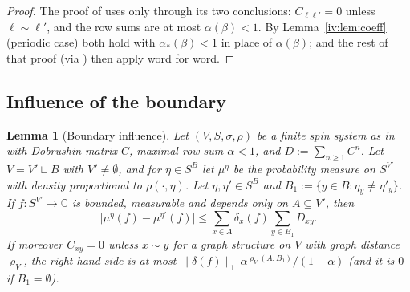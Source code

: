 \documentclass[11pt,a4paper]{article}
\newtheorem{lemma}[theorem]{Lemma}
\theoremstyle{definition}
\theoremstyle{remark}
\newcommand{\C}{\mathbb{C}}
\newcommand{\norm}[1]{\lVert #1\rVert}
\newcommand{\Flab}[2]{\cite[#1 \texttt{#2}]{F}}
\newcommand{\aS}{\alpha_*}
\begin{document}
\begin{proof}
The proof of \Flab{Theorem}{thm:strong} uses \Flab{Lemma}{lem:dobrushinbound} only through its two conclusions: $C_{\ell\ell'}=0$
unless $\ell\sim\ell'$, and the row sums are at most $\alpha(\beta)<1$. By Lemma~\ref{iv:lem:coeff} (periodic case) both hold
with $\aS(\beta)<1$ in place of $\alpha(\beta)$; \Flab{Theorem}{thm:dobrushin} and the rest of that proof (via
\Flab{Corollary}{cor:gapfromcorr}) then apply word for word.
\end{proof}

\subsection{Influence of the boundary}

\begin{lemma}[Boundary influence]\label{iv:lem:boundary}
Let $(V,S,\sigma,\rho)$ be a finite spin system as in \Flab{Definition}{def:spin} with Dobrushin matrix $C$, maximal row sum
$\alpha<1$, and $D:=\sum_{n\ge1}C^n$. Let $V=V'\sqcup B$ with $V'\neq\emptyset$, and for $\eta\in S^B$ let $\mu^\eta$ be the
probability measure on $S^{V'}$ with density proportional to $\rho(\cdot,\eta)$. Let $\eta,\eta'\in S^B$ and
$B_1:=\{y\in B:\eta_y\neq\eta'_y\}$. If $f:S^{V'}\to\C$ is bounded, measurable and depends only on $A\subseteq V'$, then
\[
\bigl|\mu^\eta(f)-\mu^{\eta'}(f)\bigr|\le\sum_{x\in A}\delta_x(f)\sum_{y\in B_1}D_{xy}.
\]
If moreover $C_{xy}=0$ unless $x\sim y$ for a graph structure on $V$ with graph distance $\varrho_V$, the right-hand side is at most
$\norm{\delta(f)}_1\,\alpha^{\varrho_V(A,B_1)}/(1-\alpha)$ (and it is $0$ if $B_1=\emptyset$).
\end{lemma}
\end{document}
